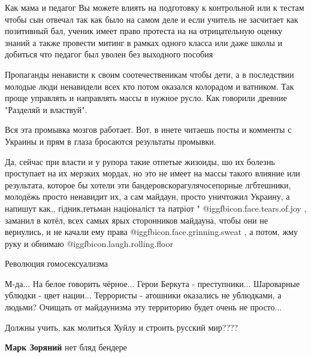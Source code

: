 \begin{itemize}

Как мама и педагог Вы можете влиять на подготовку к контрольной или к тестам
чтобы сын отвечал так как было на самом деле и если учитель не засчитает как
позитивный бал, ученик имеет право протеста на на отрицательную оценку знаний а
также провести митинг в рамках одного класса или даже школы и добиться что
педагог был уволен без выходного пособия


Пропаганды ненависти к своим соотечественикам чтобы дети, а в последствии
молодые люди ненавидели всех кто потом оказался колорадом и ватником. Так проще
управлять и направлять массы в нужное русло. Как говорили древние "Разделяй и
властвуй".


Вся эта промывка мозгов работает. Вот, в инете читаешь посты и комменты с
Украины и прям в глаза бросаются результаты промывки.


Да, сейчас при власти и у рупора такие отпетые жизоиды, шо их болезнь
проступает на их мерзких мордах, но это не имеет на массы такого влияние или
результата, которое бы хотели эти бандеровскорагулячосепорные лгбтешники,
молодёжь просто ненавидит их, а сам майдаун, просто уничтожил Украину, а
напишут как,, ґідник,ґетьман націоналіст та патріот " @igg{fbicon.face.tears.of.joy} , заманил в котёл, всех
самых ярых сторонников майдауна, чтобы они не вернулись, и не качали ему права
 @igg{fbicon.face.grinning.sweat} , а потом, жму руку и обнимаю  @igg{fbicon.laugh.rolling.floor} 

Революция гомосексуализма


М-да... На белое говорить чёрное... Герои Беркута - преступники... Шароварные
ублюдки - цвет нации... Террористы - атошники оказались не ублюдками, а людьми?
Очищать от майдаунизма эту территорию будет очень не просто...

Должны учить, как молиться Хуйлу и строить русский мир????

\begin{itemize} %
\textbf{Марк Зоряний} нет бляд бендере
\end{itemize} %

\end{itemize} %

